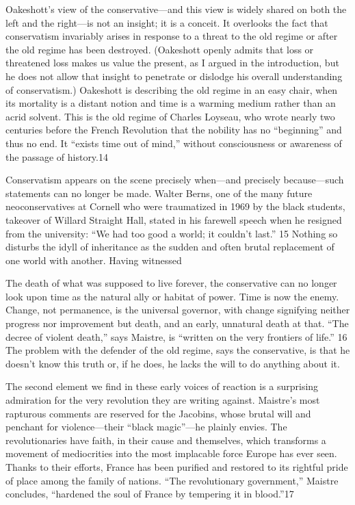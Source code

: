  \par 
Oakeshott’s view of the conservative—and this view is widely shared on both the left and the right—is not an insight; it is a conceit. It overlooks the fact that conservatism invariably arises in response to a threat to the old regime or after the old regime has been destroyed. (Oakeshott openly admits that loss or threatened loss makes us value the present, as I argued in the introduction, but he does not allow that insight to penetrate or dislodge his overall understanding of conservatism.) Oakeshott is describing the old regime in an easy chair, when its mortality is a distant notion and time is a warming medium rather than an acrid solvent. This is the old regime of Charles Loyseau, who wrote nearly two centuries before the French Revolution that the nobility has no “beginning” and thus no end. It “exists time out of mind,” without consciousness or awareness of the passage of history.{\color{blue}14}
 \par 
Conservatism appears on the scene precisely when—and precisely because—such statements can no longer be made. Walter Berns, one of the many future neoconservatives at Cornell who were traumatized in 1969 by the black students, takeover of Willard Straight Hall, stated in his farewell speech when he resigned from the university: “We had too good a world; it couldn’t last.” {\color{blue}15} Nothing so disturbs the idyll of inheritance as the sudden and often brutal replacement of one world with another. Having witnessed
 \par 
The death of what was supposed to live forever, the conservative can no longer look upon time as the natural ally or habitat of power. Time is now the enemy. Change, not permanence, is the universal governor, with change signifying neither progress nor improvement but death, and an early, unnatural death at that. “The decree of violent death,” says Maistre, is “written on the very frontiers of life.” {\color{blue}16} The problem with the defender of the old regime, says the conservative, is that he doesn’t know this truth or, if he does, he lacks the will to do anything about it.
 \par 
The second element we find in these early voices of reaction is a surprising admiration for the very revolution they are writing against. Maistre’s most rapturous comments are reserved for the Jacobins, whose brutal will and penchant for violence—their “black magic”—he plainly envies. The revolutionaries have faith, in their cause and themselves, which transforms a movement of mediocrities into the most implacable force Europe has ever seen. Thanks to their efforts, France has been purified and restored to its rightful pride of place among the family of nations. “The revolutionary government,” Maistre concludes, “hardened the soul of France by tempering it in blood.”{\color{blue}17}

